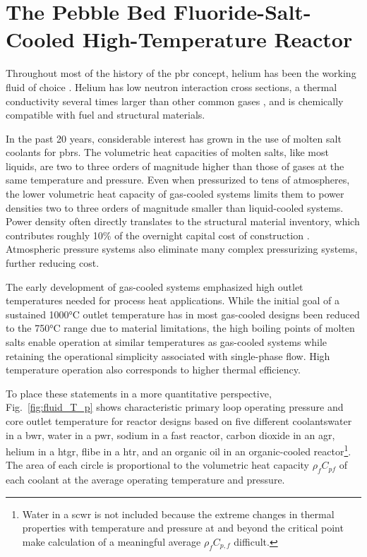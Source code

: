 \chapter[The Pebble Bed Fluoride-Salt-Cooled High-Temperature Reactor]{The Pebble Bed Fluoride-Salt-Cooled High-Temperature Reactor}
\label{sec:pbfhr}

Throughout most of the history of the \gls{pbr} concept, helium has been the working fluid of choice \cite{claxton,hecker,oehme,nrc_avr,moormann,thtr_1990,hofmann,thomas,koster,gao,chen_htr,xu_htr,htrpm}. Helium has low neutron interaction cross sections, a thermal conductivity several times larger than other common gases \cite{gases_k}, and is chemically compatible with fuel and structural materials. 

In the past 20 years, considerable interest has grown in the use of molten salt coolants for \glspl{pbr}. The volumetric heat capacities of molten salts, like most liquids, are two to three orders of magnitude higher than those of gases at the same temperature and pressure. Even when pressurized to tens of atmospheres, the lower volumetric heat capacity of gas-cooled systems limits them to power densities two to three orders of magnitude smaller than liquid-cooled systems. Power density often directly translates to the structural material inventory, which contributes roughly 10\% of the overnight capital cost of construction \cite{xin_wang_thesis}. Atmospheric pressure systems also eliminate many complex pressurizing systems, further reducing cost.

The early development of gas-cooled systems emphasized high outlet temperatures needed for process heat applications. While the initial goal of a sustained 1000\si{\celsius} outlet temperature has in most gas-cooled designs been reduced to the 750\si{\celsius} range due to material limitations, the high boiling points of molten salts enable operation at similar temperatures as gas-cooled systems while retaining the operational simplicity associated with single-phase flow. High temperature operation also corresponds to higher thermal efficiency. 

To place these statements in a more quantitative perspective, Fig.\ \ref{fig:fluid_T_p} shows characteristic primary loop operating pressure and core outlet temperature for reactor designs based on five different coolants\mdash water in a \gls{bwr}, water in a \gls{pwr}, sodium in a fast reactor, carbon dioxide in an \gls{agr}, helium in a \gls{htgr}, \gls{flibe} in a \gls{htr}, and an organic oil in an organic-cooled reactor\hspace{0.01cm}\footnote{Water in a \gls{scwr} is not included because the extreme changes in thermal properties with temperature and pressure at and beyond the critical point make calculation of a meaningful average \(\rho_fC_{p,f}\) difficult.}. The area of each circle is proportional to the volumetric heat capacity \(\rho_fC_{pf}\) of each coolant at the average operating temperature and pressure. 

